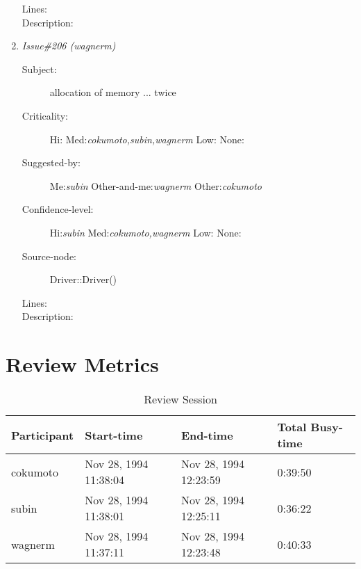 \begin{enumerate}
\begin{description}
\item [Lines:] 

\item [Description:] 
\end{description}
\item {\it Issue\#206 (wagnerm)}
\begin{description}
\item [Subject:] allocation of memory ... twice
\item [Criticality:] Hi:{\it } Med:{\it cokumoto,subin,wagnerm} Low:{\it } None:{\it }
\item [Suggested-by:] Me:{\it subin} Other-and-me:{\it wagnerm} Other:{\it cokumoto}
\item [Confidence-level:] Hi:{\it subin} Med:{\it cokumoto,wagnerm} Low:{\it } None:{\it }
\item [Source-node:] Driver::Driver()

\item [Lines:] 

\item [Description:] 
\end{description}
\end{enumerate}
\section{Review Metrics}
\begin{table}[hb]
\begin{center}
\begin{tabular}{|l|l|l|l|}
\hline
Participant & Start-time & End-time & Total Busy-time \\
\hline
cokumoto & Nov 28, 1994 11:38:04 & Nov 28, 1994 12:23:59 & 0:39:50 \\
subin & Nov 28, 1994 11:38:01 & Nov 28, 1994 12:25:11 & 0:36:22 \\
wagnerm & Nov 28, 1994 11:37:11 & Nov 28, 1994 12:23:48 & 0:40:33 \\
\hline
\end{tabular}
\end{center}
\caption{Review Session}
\end{table}


